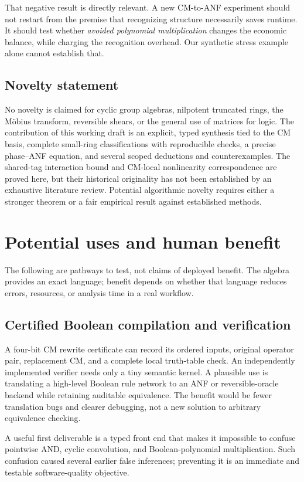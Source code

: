 \documentclass[11pt,a4paper]{article}
\theoremstyle{definition}\newtheorem{definition}[theorem]{Definition}
\theoremstyle{remark}\newtheorem{remark}[theorem]{Remark}
\numberwithin{equation}{section}
\begin{document}
That negative result is directly relevant. A new CM-to-ANF experiment should not restart from the premise that recognizing structure necessarily saves runtime. It should test whether \emph{avoided polynomial multiplication} changes the economic balance, while charging the recognition overhead. Our synthetic stress example alone cannot establish that.

\subsection{Novelty statement}
No novelty is claimed for cyclic group algebras, nilpotent truncated rings, the M\"obius transform, reversible shears, or the general use of matrices for logic. The contribution of this working draft is an explicit, typed synthesis tied to the CM basis, complete small-ring classifications with reproducible checks, a precise phase--ANF equation, and several scoped deductions and counterexamples. The shared-tag interaction bound and CM-local nonlinearity correspondence are proved here, but their historical originality has not been established by an exhaustive literature review. Potential algorithmic novelty requires either a stronger theorem or a fair empirical result against established methods.

\section{Potential uses and human benefit}\label{sec:uses}
The following are pathways to test, not claims of deployed benefit. The algebra provides an exact language; benefit depends on whether that language reduces errors, resources, or analysis time in a real workflow.

\subsection{Certified Boolean compilation and verification}
A four-bit CM rewrite certificate can record its ordered inputs, original operator pair, replacement CM, and a complete local truth-table check. An independently implemented verifier needs only a tiny semantic kernel. A plausible use is translating a high-level Boolean rule network to an ANF or reversible-oracle backend while retaining auditable equivalence. The benefit would be fewer translation bugs and clearer debugging, not a new solution to arbitrary equivalence checking.

A useful first deliverable is a typed front end that makes it impossible to confuse pointwise AND, cyclic convolution, and Boolean-polynomial multiplication. Such confusion caused several earlier false inferences; preventing it is an immediate and testable software-quality objective.
\end{document}
